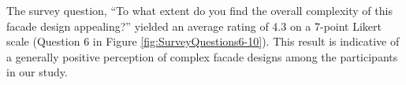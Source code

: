 








The survey question, ``To what extent do you find the overall complexity of this facade design appealing?'' yielded an average rating of 4.3 on a 7-point Likert scale (Question 6 in Figure \ref{fig:SurveyQuestions6-10}).
This result is indicative of a generally positive perception of complex facade designs among the participants in our study.

